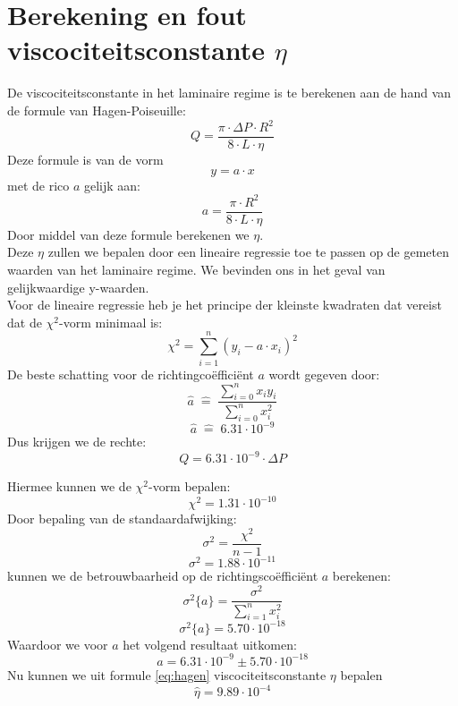 \section{Berekening en fout viscociteitsconstante $\eta$}

De viscociteitsconstante in het laminaire regime is te berekenen aan de hand van de formule van Hagen-Poiseuille:
\begin{equation}
    \label{eq:hagen}
    Q = \frac{\pi \cdot \Delta P \cdot R^2}{8 \cdot L \cdot \eta}
\end{equation}
Deze formule is van de vorm $$y=a\cdot x$$ met de rico $a$ gelijk aan: $$a = \frac{\pi \cdot R^2}{8 \cdot L \cdot \eta}$$
Door middel van deze formule berekenen we $\eta$. \\

Deze $\eta$ zullen we bepalen door een lineaire regressie toe te passen op de gemeten waarden van het laminaire regime.
We bevinden ons in het geval van gelijkwaardige y-waarden.\\

Voor de lineaire regressie heb je het principe der kleinste kwadraten dat vereist
dat de $\chi ^2$-vorm minimaal is: 
\begin{equation}
    \chi ^2 = \sum\limits_{i=1}^n(y_i-a\cdot x_i)^2
\end{equation}
De beste schatting voor de richtingcoëfficiënt $a$ wordt gegeven door:
\begin{equation}
    \label{eq:a}
    \hat{a} \; \hat{=} \;\frac{\sum\limits_{i=0}^n x_i  y_i}{\sum\limits_{i=0}^n x_i^2}
\end{equation}
\begin{equation*}
    \hat{a} \; \hat{=} \; 6.31 \cdot 10^{-9}
\end{equation*}
Dus krijgen we de rechte: $$Q = 6.31\cdot 10^{-9} \cdot \Delta P$$

Hiermee kunnen we de $\chi ^2$-vorm bepalen:
\begin{equation*}
    \chi ^2 = 1.31 \cdot 10^{-10}
\end{equation*}
Door bepaling van de standaardafwijking: 
\begin{equation}
    \sigma ^2 = \frac{\chi ^2}{n - 1}
\end{equation}
\begin{equation*}
    \sigma ^2 = 1.88 \cdot 10^{-11}
\end{equation*}
kunnen we de betrouwbaarheid op de richtingscoëfficiënt $a$ berekenen: 
\begin{equation}
    \label{eq:sa}
    \sigma ^2 \{ a \} = \frac{\sigma ^2}{\sum\limits_{i=1}^n x_i^2}
\end{equation}
\begin{equation*}
    \sigma ^2 \{ a \} =  5.70 \cdot 10^{-18}
\end{equation*}
Waardoor we voor $a$ het volgend resultaat uitkomen:
$$a = 6.31 \cdot 10^{-9} \pm 5.70 \cdot 10^{-18}$$
Nu kunnen we uit formule \eqref{eq:hagen} viscociteitsconstante $\eta$ bepalen
\begin{equation*}
    \hat{\eta} = 9.89 \cdot 10^{-4}
\end{equation*}

